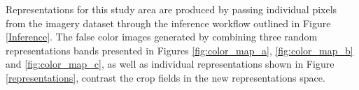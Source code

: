 \documentclass[journal,article,submit,pdftex,moreauthors]{Definitions/mdpi}
\begin{document}
Representations for this study area are produced by passing individual pixels from the imagery dataset through the inference workflow outlined in Figure \ref{Inference}. 
The false color images generated by combining three random representations bands presented in Figures \ref{fig:color_map_a}, \ref{fig:color_map_b} and \ref{fig:color_map_c}, as well as individual representations shown in Figure \ref{representations}, contrast the crop fields in the new representations space.
\end{document}
